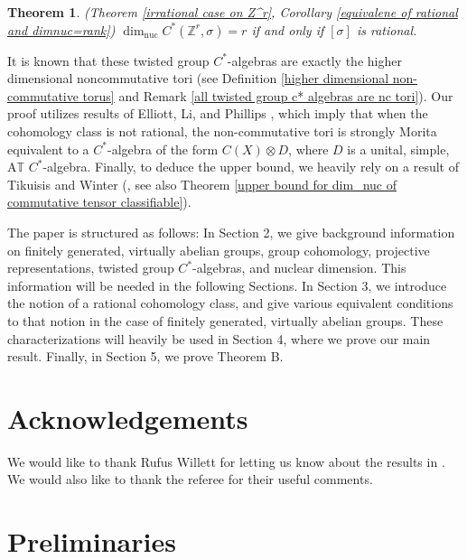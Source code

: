 \documentclass{amsart}
\newtheorem{theorem}{Theorem}[section]
\theoremstyle{definition}
\renewcommand{\thetheorem}{\Alph{theorem}}  %
\newcommand{\Z}{\mathbb{Z}}
\newcommand{\TT}{\mathbb{T}}
\DeclareMathOperator{\nuc}{nuc}
\newcommand{\dimnuc}{\dim_{\nuc}}
\begin{document}
\begin{theorem} (Theorem \ref{irrational case on Z^r}, Corollary \ref{equivalene of rational and dimnuc=rank})
    $\dimnuc C^{\ast}(\Z^r, \sigma)=r$ if and only if $[\sigma]$ is rational.
\end{theorem}
It is known that these twisted group $C^*$-algebras are exactly the higher dimensional noncommutative tori (see Definition \ref{higher dimensional non-commutative torus} and Remark \ref{all twisted group c* algebras are nc tori}). Our proof utilizes results of Elliott, Li, and Phillips \cite{elliott2006moritaequivalencesmoothnoncommutative,Morita_equivalence_nc_tori, simple_nc_torus}, which imply that when the cohomology class is not rational, the non-commutative tori is strongly Morita equivalent to a $C^*$-algebra of the form $C(X)\otimes D$, where $D$ is a unital, simple, A$\TT$ $C^*$-algebra. Finally, to deduce the upper bound, we heavily rely on a result of Tikuisis and Winter (\cite{nuclear_dimension_commutative_tensor_Z}, see also Theorem \ref{upper bound for dim_nuc of commutative tensor classifiable}). \par
The paper is structured as follows: In Section 2, we give background information on finitely generated, virtually abelian groups, group cohomology, projective representations, twisted group $C^{\ast}$-algebras,  and nuclear dimension. This information will be needed in the following Sections. In Section 3, we introduce the notion of a rational cohomology class, and give various equivalent conditions to that notion in the case of finitely generated, virtually abelian groups. These characterizations will heavily be used in Section 4, where we prove our main result. Finally, in Section 5, we prove Theorem B.

\section*{Acknowledgements}
We would like to thank Rufus Willett for letting us know about the results in \cite{nuclear_dimension_commutative_tensor_Z}. We would also like to thank the referee for their useful comments.



\section{Preliminaries}
\renewcommand{\thetheorem}{\thesection.\arabic{theorem}}
\end{document}
